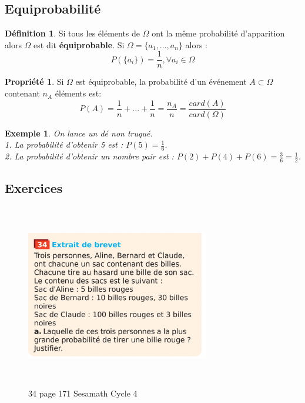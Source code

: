 \documentclass[a4paper,12pt,final]{article}
\newtheorem{Ex}{Exemple}[section]
\theoremstyle{theorem}
\theoremstyle{definition}
\newtheorem{Propriete}{Propriété}[section]
\theoremstyle{definition}
\theoremstyle{definition}
\newtheorem{Def}{Définition}[section]
\begin{document}
	\subsection{Equiprobabilité}
		\begin{Def}
			Si tous les éléments de $\Omega$ ont la même probabilité d'apparition alors $\Omega$ est dit \textbf{équiprobable}. Si $\Omega = \{a_{1},...,a_{n}\}$ alors : 
			\[P(\{a_{i}\}) = \frac{1}{n}, \forall a_{i} \in \Omega \] 
		\end{Def}
	
		\begin{Propriete}
			Si $\Omega$ est équiprobable, la probabilité d'un événement $A\subset \Omega$ contenant $n_{A}$ éléments est:
			\[P(A) = \frac{1}{n} + ... + \frac{1}{n} = \frac{n_{A}}{n} = \frac{card(A)}{card(\Omega)}\]
		\end{Propriete}
	
		\begin{Ex}
			On lance un dé non truqué. \\
			1. La probabilité d'obtenir 5 est : $P(5) = \frac{1}{6}$. \\
			2. La probabilité d'obtenir un nombre pair est : $P(2)+P(4)+P(6) = \frac{3}{6} = \frac{1}{2}$.
		\end{Ex}
	
	\subsection{Exercices}
		\begin{figure}[h!]
			\centering
			\includegraphics[width=8cm,height=8cm]{SesamathC4_34p171.pdf}
			\caption{34 page 171 Sesamath Cycle 4}
			\label{fig:sesamathc434p171}
		\end{figure}
	
\end{document}
